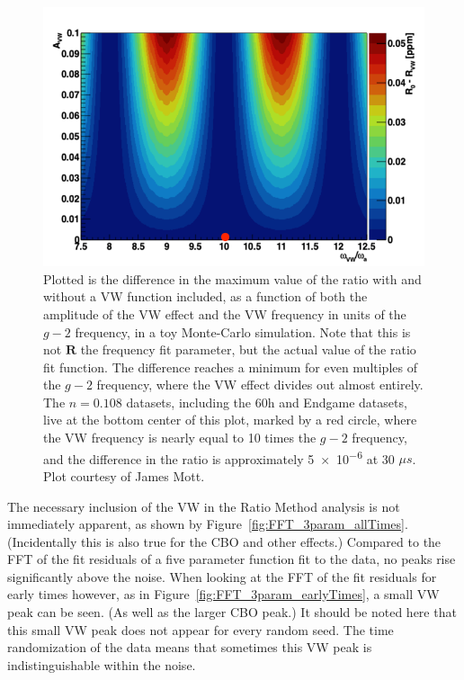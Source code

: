 \documentclass[12pt,letterpaper]{article}
\newcommand{\figref}[1]{Figure~\ref{#1}}
\def\gmtwo{$g-2$\xspace}
\begin{document}
\begin{figure}[]
    \centering
    \includegraphics[width=.8\textwidth]{VWRatioDiff}
    \caption[]{Plotted is the difference in the maximum value of the ratio with and without a VW function included, as a function of both the amplitude of the VW effect and the VW frequency in units of the \gmtwo frequency, in a toy Monte-Carlo simulation. Note that this is not $\boldsymbol{R}$ the frequency fit parameter, but the actual value of the ratio fit function. The difference reaches a minimum for even multiples of the \gmtwo frequency, where the VW effect divides out almost entirely. The $n = 0.108$ datasets, including the 60h and Endgame datasets, live at the bottom center of this plot, marked by a red circle, where the VW frequency is nearly equal to 10 times the \gmtwo frequency, and the difference in the ratio is approximately \SI{5e-6}{} at 30 $\mu s$. Plot courtesy of James Mott.}
    \label{fig:VWRatioDiff}
\end{figure}




\clearpage



The necessary inclusion of the VW in the Ratio Method analysis is not immediately apparent, as shown by \figref{fig:FFT_3param_allTimes}. (Incidentally this is also true for the CBO and other effects.) Compared to the FFT of the fit residuals of a five parameter function fit to the data, no peaks rise significantly above the noise. When looking at the FFT of the fit residuals for early times however, as in \figref{fig:FFT_3param_earlyTimes}, a small VW peak can be seen. (As well as the larger CBO peak.) It should be noted here that this small VW peak does not appear for every random seed. The time randomization of the data means that sometimes this VW peak is indistinguishable within the noise. 
\end{document}
